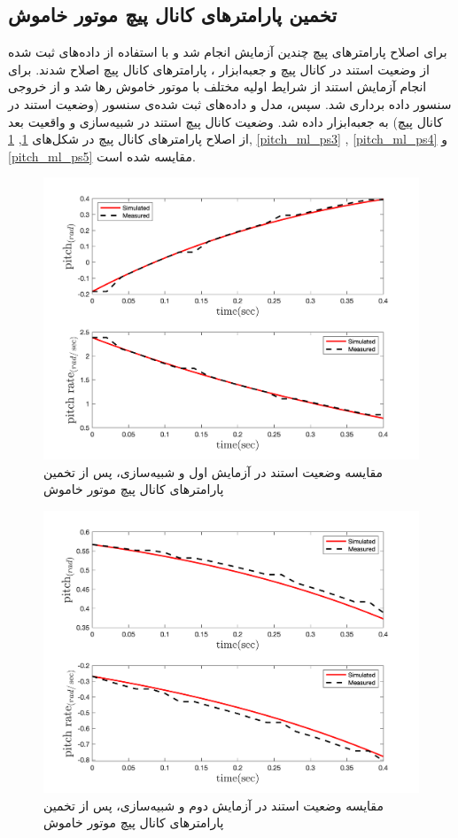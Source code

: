 \subsection{تخمین پارامترهای کانال پیچ موتور خاموش}
برای اصلاح پارامترهای پیچ چندین آزمایش انجام شد و با استفاده از داده‌های ثبت شده از وضعیت استند در کانال پیچ و جعبه‌ابزار
،
پارامترهای کانال پیچ اصلاح شدند.
برای انجام آزمایش استند از شرایط اولیه مختلف با موتور خاموش رها شد  و از خروجی سنسور داده برداری شد. سپس، مدل و داده‌های ثبت شده‌ی سنسور (وضعیت استند در کانال پیچ) به جعبه‌ابزار
داده شد. وضعیت کانال پیچ استند در شبیه‌سازی و واقعیت بعد از اصلاح پارامترهای کانال پیچ در شکل‌های
\ref{pitch_ml_ps1}, \ref{pitch_ml_ps1}, \ref{pitch_ml_ps3} , \ref{pitch_ml_ps4}  و \ref{pitch_ml_ps5}
مقایسه شده است.

\begin{figure}[H]
	\includegraphics[width=12cm]{../Figures/RCP/pitch_ml_parameter_estimation/RCP_pitch_S1.png}
	\centering
	\caption{مقايسه وضعیت استند در  آزمايش اول و شبیه‌سازی، پس از تخمین پارامترهای کانال پیچ موتور خاموش}
	\label{pitch_ml_ps1}
\end{figure}
\begin{figure}[H]
	\includegraphics[width=12cm]{../Figures/RCP/pitch_ml_parameter_estimation/RCP_pitch_S2.png}
	\centering
	\caption{مقايسه وضعیت استند در  آزمايش دوم و شبیه‌سازی، پس از تخمین پارامترهای کانال پیچ موتور خاموش}
	\label{pitch_ml_ps2}
\end{figure}
